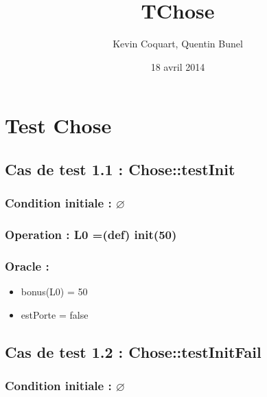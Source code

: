 \documentclass[11pt]{article}
\title{TChose}
\author{Kevin Coquart, Quentin Bunel}
\date{18 avril 2014}
\begin{document}
\maketitle

\setcounter{tocdepth}{3}
\tableofcontents
\vspace*{1cm}
\section{Test Chose}
\label{sec-1}


\subsection{Cas de test 1.1 : Chose::testInit}
\label{sec-1.1}

\subsubsection{Condition initiale : $\varnothing$}
\label{sec-1.1.1}

\subsubsection{Operation : L0 =(def) init(50)}
\label{sec-1.1.2}

\subsubsection{Oracle :}
\label{sec-1.1.3}

\begin{itemize}

\item bonus(L0) = 50\\
\label{sec-1.1.3.1}


\item estPorte = false\\
\label{sec-1.1.3.2}



\end{itemize} %
\subsection{Cas de test 1.2 : Chose::testInitFail}
\label{sec-1.2}

\subsubsection{Condition initiale : $\varnothing$}
\label{sec-1.2.1}
\end{document}
